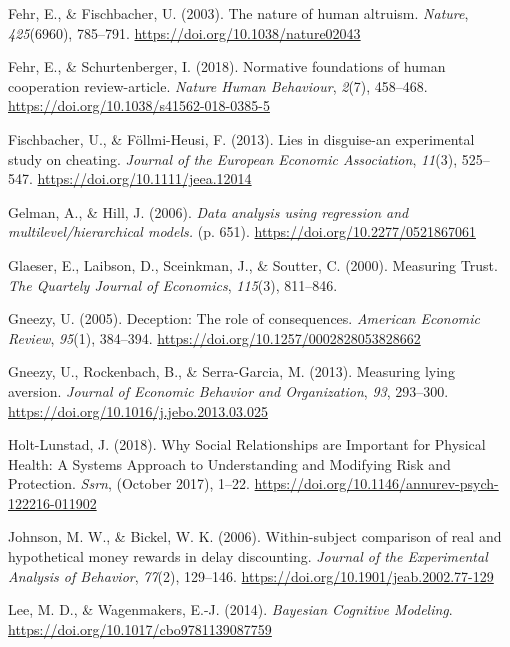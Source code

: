 \documentclass[12pt,]{article}
\begin{document}
\leavevmode\hypertarget{ref-Fehr2003}{}%
Fehr, E., \& Fischbacher, U. (2003). The nature of human altruism.
\emph{Nature}, \emph{425}(6960), 785--791.
\url{https://doi.org/10.1038/nature02043}

\leavevmode\hypertarget{ref-Fehr2018}{}%
Fehr, E., \& Schurtenberger, I. (2018). Normative foundations of human
cooperation review-article. \emph{Nature Human Behaviour}, \emph{2}(7),
458--468. \url{https://doi.org/10.1038/s41562-018-0385-5}

\leavevmode\hypertarget{ref-Fischbacher2013a}{}%
Fischbacher, U., \& Föllmi-Heusi, F. (2013). Lies in disguise-an
experimental study on cheating. \emph{Journal of the European Economic
Association}, \emph{11}(3), 525--547.
\url{https://doi.org/10.1111/jeea.12014}

\leavevmode\hypertarget{ref-Gelman2006}{}%
Gelman, A., \& Hill, J. (2006). \emph{Data analysis using regression and
multilevel/hierarchical models.} (p. 651).
\url{https://doi.org/10.2277/0521867061}

\leavevmode\hypertarget{ref-Glaeser2000}{}%
Glaeser, E., Laibson, D., Sceinkman, J., \& Soutter, C. (2000).
Measuring Trust. \emph{The Quartely Journal of Economics},
\emph{115}(3), 811--846.

\leavevmode\hypertarget{ref-Gneezy2005}{}%
Gneezy, U. (2005). Deception: The role of consequences. \emph{American
Economic Review}, \emph{95}(1), 384--394.
\url{https://doi.org/10.1257/0002828053828662}

\leavevmode\hypertarget{ref-Gneezy2013}{}%
Gneezy, U., Rockenbach, B., \& Serra-Garcia, M. (2013). Measuring lying
aversion. \emph{Journal of Economic Behavior and Organization},
\emph{93}, 293--300. \url{https://doi.org/10.1016/j.jebo.2013.03.025}

\leavevmode\hypertarget{ref-Holt-Lunstad2018}{}%
Holt-Lunstad, J. (2018). Why Social Relationships are Important for
Physical Health: A Systems Approach to Understanding and Modifying Risk
and Protection. \emph{Ssrn}, (October 2017), 1--22.
\url{https://doi.org/10.1146/annurev-psych-122216-011902}

\leavevmode\hypertarget{ref-Johnson2006}{}%
Johnson, M. W., \& Bickel, W. K. (2006). Within-subject comparison of
real and hypothetical money rewards in delay discounting. \emph{Journal
of the Experimental Analysis of Behavior}, \emph{77}(2), 129--146.
\url{https://doi.org/10.1901/jeab.2002.77-129}

\leavevmode\hypertarget{ref-Lee2014}{}%
Lee, M. D., \& Wagenmakers, E.-J. (2014). \emph{Bayesian Cognitive
Modeling}. \url{https://doi.org/10.1017/cbo9781139087759}
\end{document}
